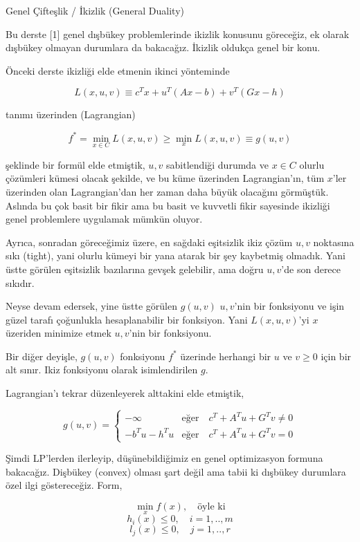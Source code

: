 \documentclass[12pt,fleqn]{article}\usepackage{../../common}
\begin{document}
Genel Çifteşlik / İkizlik (General Duality)

Bu derste [1] genel dışbükey problemlerinde ikizlik konusunu göreceğiz, ek
olarak dışbükey olmayan durumlara da bakacağız. İkizlik oldukça genel bir
konu.

Önceki derste ikizliği elde etmenin ikinci yönteminde 

$$
L(x,u,v) \equiv c^T x + u^T (Ax-b) + v^T (Gx-h) 
$$

tanımı üzerinden (Lagrangian)

$$
f^\ast = \min_{x \in C} L(x,u,v) \ge \min_x L(x,u,v) \equiv g(u,v)
$$

şeklinde bir formül elde etmiştik, $u,v$ sabitlendiği durumda ve $x \in C$
olurlu çözümleri kümesi olacak şekilde, ve bu küme üzerinden Lagrangian'ın,
tüm $x$'ler üzerinden olan Lagrangian'dan her zaman daha büyük olacağını
görmüştük. Aslında bu çok basit bir fikir ama bu basit ve kuvvetli fikir
sayesinde ikizliği genel problemlere uygulamak mümkün oluyor. 

Ayrıca, sonradan göreceğimiz üzere, en sağdaki eşitsizlik ikiz çözüm $u,v$
noktasına sıkı (tight), yani olurlu kümeyi bir yana atarak bir şey
kaybetmiş olmadık. Yani üstte görülen eşitsizlik bazılarına gevşek
gelebilir, ama doğru $u,v$'de son derece sıkıdır. 

Neyse devam edersek, yine üstte görülen $g(u,v)$ $u,v$'nin bir fonksiyonu
ve işin güzel tarafı çoğunlukla hesaplanabilir bir fonksiyon. Yani
$L(x,u,v)$'yi $x$ üzeriden minimize etmek $u,v$'nin bir fonksiyonu. 

Bir diğer deyişle, $g(u,v)$ fonksiyonu $f^\ast$ üzerinde herhangi bir $u$ ve
$v \ge 0$ için bir alt sınır. Ikiz fonksiyonu olarak isimlendirilen $g$.

Lagrangian'ı tekrar düzenleyerek alttakini elde etmiştik, 

$$
g(u,v) = \left\{ \begin{array}{ll}
-\infty & \text{eğer} \quad c^T + A^Tu + G^T v \ne 0 \\
- b^T u - h^Tu & \text{eğer} \quad c^T + A^Tu + G^T v = 0 
\end{array} \right.
$$

Şimdi LP'lerden ilerleyip, düşünebildiğimiz en genel optimizasyon formuna
bakacağız. Dişbükey (convex) olması şart değil ama tabii ki dışbükey
durumlara özel ilgi göstereceğiz. Form,

$$
\min_{x} f(x), \quad \textrm{öyle ki}
$$
$$
h_i(x) \le 0, \quad i=1,..,m
$$
$$
l_j(x) \le 0, \quad j=1,..,r
$$
\end{document}
